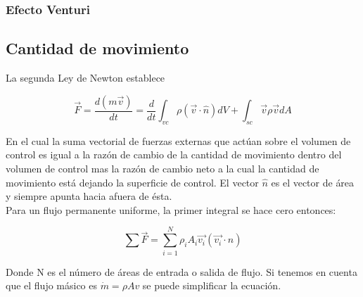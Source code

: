 \subsubsection{Efecto Venturi}

\subsection{Cantidad de movimiento}

La segunda Ley de Newton establece

\begin{equation*}
	\vec{F} = \dfrac{d(m \vec{v})}{dt} = \dfrac{d}{dt} \int_{vc} \rho (\vec{v} \cdot \widehat{n}) dV + \int_{sc} \vec{v} \rho \vec{v} dA
\end{equation*}

En el cual la suma vectorial de fuerzas externas que actúan sobre el volumen de control es igual a la razón de cambio de la cantidad de movimiento dentro del volumen de control mas la razón de cambio neto a la cual la cantidad de movimiento está dejando la superficie de control. El vector $\widehat{n}$ es el vector de área y siempre apunta hacia afuera de ésta.\\

Para un flujo permanente uniforme, la primer integral se hace cero entonces:

\begin{equation}
	\sum \vec{F} = \sum_{i = 1}^{N} \rho_{i} A_{i} \vec{v_{i}} (\vec{v_{i}} \cdot \widehat{n})
\end{equation}

Donde N es el número de áreas de entrada o salida de flujo. Si tenemos en cuenta que el flujo másico es $\dot{m} = \rho A v$ se puede simplificar la ecuación.


